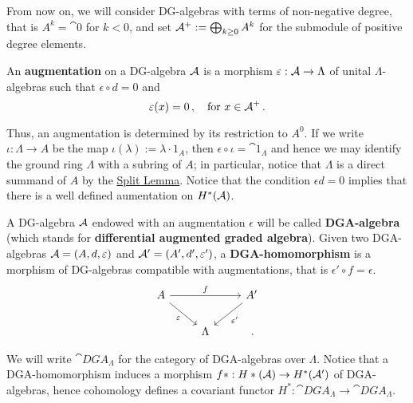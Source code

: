 	
	From now on, we will consider DG-algebras with terms of 
	non-negative degree, that is $A^{k} = \cat{0}$ for $k<0$,
	and set $\mathcal{A}^{+} := \bigoplus_{k \ge 0} A^{k}$ for the
	submodule of positive degree elements.
	
	\begin{df}
		An \textbf{augmentation} on a DG-algebra $\mathcal{A}$
		is a morphism $\varepsilon : \mathcal{A} \to \Lambda$
		of unital $\Lambda$-algebras such that $\epsilon \circ d = 0$ and
		\begin{equation*}
			\varepsilon(x) = 0\,, \quad \text{for }
			x \in \mathcal{A}^{+}\,.
		\end{equation*}
	\end{df}
	
	Thus, an augmentation is determined by its restriction to $A^{0}$.
	If we write $\iota : \Lambda \to A$ be the map
	$\iota(\lambda) := \lambda \cdot 1_{A}$, 
	then $\epsilon \circ \iota = \cat{1}_{\Lambda}$ and hence
	we may identify the ground ring $\Lambda$ with a subring of $A$;
	in particular, notice that $\Lambda$ is a direct summand of $A$
	by the \hyperref[split-lemma]{Split Lemma}.
	Notice that the condition $\epsilon d = 0$ implies
	that there is a well defined aumentation on $H^*(\mathcal{A})$.
	
	
	\begin{df}
		A DG-algebra $\mathcal{A}$ endowed with an augmentation $\epsilon$
		will be called \textbf{DGA-algebra} 
		(which stands for \textbf{differential augmented graded algebra}).
		Given two DGA-algebras 
		$\mathcal{A} = (A,d,\varepsilon)$ and $\mathcal{A}' = (A',d',\varepsilon')$,
		a \textbf{DGA-homomorphism} is a morphism
		of DG-algebras compatible with augmentations,
		that is $\epsilon' \circ f = \epsilon$.
		\begin{equation*}
			\begin{tikzcd}
				A \ar[rr, "f"] \ar[dr, "\epsilon"'] & & A' \ar[dl, "\epsilon'"] \\
				& \Lambda & \,.
			\end{tikzcd}
		\end{equation*}
	\end{df}
	
	We will write $\cat{DGA}_{\Lambda}$ for the category of
	DGA-algebras over $\Lambda$.
	Notice that a DGA-homomorphism induces a morphism $f*:H*(\mathcal{A}) \to H^*(\mathcal{A}')$
	of DGA-algebras, hence cohomology defines a covariant functor
	$H^*:\cat{DGA}_{\Lambda} \to \cat{DGA}_{\Lambda}$.
	
